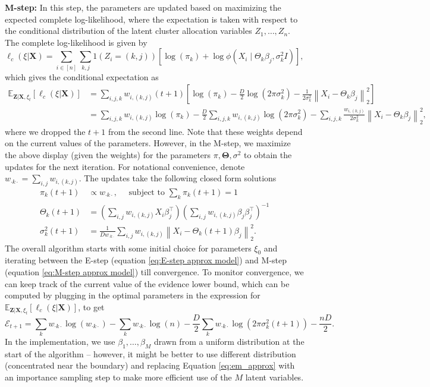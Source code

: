 \documentclass[bj,authoryear]{imsart}
\theoremstyle{plain}
\theoremstyle{remark}
\def\bX{\mathbf{X}}
\def\bZ{\mathbf{Z}}
\def\bTheta{{\boldsymbol\Theta}}
\def\bbE{\mathbb{E}}
\def\cE{\mathcal{E}}
\def\norm#1{\left\|#1\right\|}
\def\bTheta{\boldsymbol{\Theta}}
\begin{document}
\vspace{1em}
\textbf{M-step:} In this step, the parameters are updated based on maximizing the expected complete log-likelihood, where the expectation is taken with respect to the conditional distribution of the latent cluster allocation variables $Z_1,\dots,Z_n$. The complete log-likelihood is given by
$$\ell_c(\xi|\bX) = \sum_{i\in[n]} \sum_{k,j} 1(Z_i=(k,j)) \left[\log(\pi_k) + \log \phi(X_i\mid \Theta_k\beta_j, \sigma_k^2 I)\right],$$
which gives the conditional expectation as
\begin{equation}
\begin{aligned}
    \bbE_{\bZ|\bX,\xi_t}[\ell_c(\xi|\bX)] &= \sum_{i,j,k} w_{i,(k,j)}(t+1) \left[\log(\pi_k) -\frac{D}{2}\log(2\pi\sigma_k^2) - \frac{1}{2\sigma_k^2}\norm{X_i - \Theta_k\beta_j}_2^2\right] \\
    &= \sum_{i,j,k} w_{i,(k,j)} \log(\pi_k) -\frac{D}{2}\sum_{i,j,k} w_{i,(k,j)}\log(2\pi\sigma_k^2) - \sum_{i,j,k} \frac{w_{i,(k,j)}}{2\sigma_k^2} \norm{X_i - \Theta_k\beta_j}_2^2,
\end{aligned}
\end{equation}
where we dropped the $t+1$ from the second line. Note that these weights depend on the current values of the parameters. However, in the M-step, we maximize the above display (given the weights) for the parameters $\pi,\bTheta,\sigma^2$ to obtain the updates for the next iteration. For notational convenience, denote
$w_{\cdot k\cdot} = \sum_{i,j} w_{i, (k,j)}.$
The updates take the following closed form solutions
\begin{equation}
\begin{aligned}\label{eq:M-step approx model}
    \pi_k(t+1) &\propto w_{\cdot k \cdot}, \quad \text{ subject to }  \sum_k \pi_k(t+1)=1 \\
    \Theta_k(t+1) &= \left(\sum_{i,j} w_{i,(k,j)} X_i\beta_j^\top \right)\left(\sum_{i,j} w_{i,(k,j)} \beta_j\beta_j^\top\right)^{-1}\\
    \sigma_k^2(t+1) &= \frac{1}{Dw_{\cdot k \cdot}}\sum_{i,j} w_{i,(k,j)}\norm{X_i - \Theta_k(t+1)\beta_j}_2^2.
\end{aligned}
\end{equation}
The overall algorithm starts with some initial choice for parameters $\xi_0$ and iterating between the E-step (equation \eqref{eq:E-step approx model}) and M-step (equation \eqref{eq:M-step approx model}) till convergence. To monitor convergence, we can keep track of the current value of the evidence lower bound, which can be computed by plugging in the optimal parameters in the expression for $\bbE_{\bZ|\bX,\xi_t}[\ell_c(\xi|\bX)]$, to get
$$\cE_{t+1} = \sum_k w_{\cdot k\cdot} \log (w_{\cdot k \cdot}) - \sum_k w_{\cdot k \cdot}\log (n) - \frac{D}{2}\sum_k w_{\cdot k \cdot}\log(2\pi \sigma_k^2(t+1)) - \frac{nD}{2}.$$
 In the implementation, we use $\beta_1,\dots,\beta_M$ drawn from a uniform distribution at the start of the algorithm -- however, it might be better to use different distribution (concentrated near the boundary) and replacing Equation \eqref{eq:em_approx} with an importance sampling step to make more efficient use of the $M$ latent variables.
\end{document}
